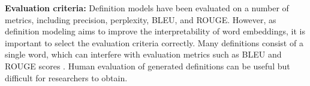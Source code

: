 \noindent\textbf{Evaluation criteria:} Definition models have been evaluated on a number of metrics, including precision, perplexity, BLEU, and ROUGE. However,
as definition modeling aims to improve the interpretability of word embeddings, it is important to select the evaluation criteria correctly. Many definitions consist of a single word, which can interfere with evaluation metrics such as BLEU and ROUGE scores \cite{mickus_mark_2019}. Human
evaluation of generated definitions can be useful but difficult for researchers to obtain.
